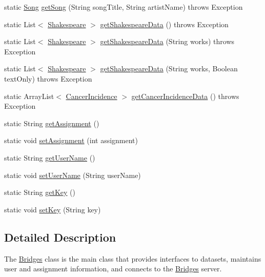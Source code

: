\begin{DoxyCompactItemize}
static \hyperlink{classbridges_1_1data__src__dependent_1_1_song}{Song} \hyperlink{classbridges_1_1connect_1_1_bridges_ae7621c3cfd9978aa02fe243317cf0cca}{get\+Song} (String song\+Title, String artist\+Name)  throws Exception 
\item 
static List$<$ \hyperlink{classbridges_1_1data__src__dependent_1_1_shakespeare}{Shakespeare} $>$ \hyperlink{classbridges_1_1connect_1_1_bridges_adc8d19f28677afb03db53736455de2d0}{get\+Shakespeare\+Data} ()  throws Exception 
\item 
static List$<$ \hyperlink{classbridges_1_1data__src__dependent_1_1_shakespeare}{Shakespeare} $>$ \hyperlink{classbridges_1_1connect_1_1_bridges_a53ac587893826c57644f2e03b33ae455}{get\+Shakespeare\+Data} (String works)  throws Exception 
\item 
static List$<$ \hyperlink{classbridges_1_1data__src__dependent_1_1_shakespeare}{Shakespeare} $>$ \hyperlink{classbridges_1_1connect_1_1_bridges_aa81c312e631bc76fa49e0ccae66679dc}{get\+Shakespeare\+Data} (String works, Boolean text\+Only)  throws Exception 
\item 
static Array\+List$<$ \hyperlink{classbridges_1_1data__src__dependent_1_1_cancer_incidence}{Cancer\+Incidence} $>$ \hyperlink{classbridges_1_1connect_1_1_bridges_ad3d3afcf9df9e2b87d069bc050029628}{get\+Cancer\+Incidence\+Data} ()  throws Exception 
\item 
static String \hyperlink{classbridges_1_1connect_1_1_bridges_af049c06c532987eb616156fb16ea2f43}{get\+Assignment} ()
\item 
static void \hyperlink{classbridges_1_1connect_1_1_bridges_ad56c9d138965c41947bb51fe056c1cc9}{set\+Assignment} (int assignment)
\item 
static String \hyperlink{classbridges_1_1connect_1_1_bridges_a75f047cda3100e0cfa88378293c12961}{get\+User\+Name} ()
\item 
static void \hyperlink{classbridges_1_1connect_1_1_bridges_af9b9a2ca03ba02c0c2be4716594678a6}{set\+User\+Name} (String user\+Name)
\item 
static String \hyperlink{classbridges_1_1connect_1_1_bridges_a426897d6e5449601bb4e20c32b8346f5}{get\+Key} ()
\item 
static void \hyperlink{classbridges_1_1connect_1_1_bridges_ab69e89ec7d2e674a8b8c4b0be0c63397}{set\+Key} (String key)
\end{DoxyCompactItemize}


\subsection{Detailed Description}
The \hyperlink{classbridges_1_1connect_1_1_bridges}{Bridges} class is the main class that provides interfaces to datasets, maintains user and assignment information, and connects to the \hyperlink{classbridges_1_1connect_1_1_bridges}{Bridges} server. 

